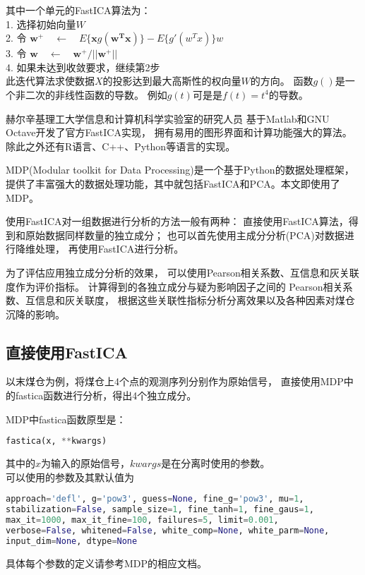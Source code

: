 其中一个单元的FastICA算法为：\\
	1. 选择初始向量$W$ \\
	2. 令 $\bm{w}^{+} \quad \leftarrow 
			\quad E\{\bm{x}g(\bm{w^Tx})\} - E\{g'(w^Tx)\}w$ \\
	3. 令 $\bm{w} \quad \leftarrow \quad 
			\bm{w}^{+}/||\bm{w}^{+}||$ \\
	4. 如果未达到收敛要求，继续第2步 \\
此迭代算法求使数据$X$的投影达到最大高斯性的权向量$W$的方向。
函数$g()$是一个非二次的非线性函数的导数。
例如$g(t)$可是是$f(t)=t^4$的导数。

赫尔辛基理工大学信息和计算机科学实验室的研究人员
基于Matlab和GNU Octave开发了官方FastICA实现，
拥有易用的图形界面和计算功能强大的算法。
除此之外还有R语言、C++、Python等语言的实现。

MDP(Modular toolkit for Data Processing)是一个基于Python的数据处理框架，
提供了丰富强大的数据处理功能，其中就包括FastICA和PCA。本文即使用了MDP。

使用FastICA对一组数据进行分析的方法一般有两种：
直接使用FastICA算法，得到和原始数据同样数量的独立成分；
也可以首先使用主成分分析(PCA)对数据进行降维处理，
再使用FastICA进行分析。

为了评估应用独立成分分析的效果，
可以使用Pearson相关系数、互信息和灰关联度作为评价指标。
计算得到的各独立成分与疑为影响因子之间的
Pearson相关系数、互信息和灰关联度，
根据这些关联性指标分析分离效果以及各种因素对煤仓沉降的影响。

\subsection{直接使用FastICA}
以末煤仓为例，将煤仓上4个点的观测序列分别作为原始信号，
直接使用MDP中的fastica函数进行分析，得出4个独立成分。

MDP中fastica函数原型是：
\begin{lstlisting}[language=Python, basicstyle=\ttfamily]
fastica(x, **kwargs)
\end{lstlisting}
其中的$x$为输入的原始信号，$kwargs$是在分离时使用的参数。\\
可以使用的参数及其默认值为
\begin{lstlisting}[language=Python, basicstyle=\ttfamily]
approach='defl', g='pow3', guess=None, fine_g='pow3', mu=1, 
stabilization=False, sample_size=1, fine_tanh=1, fine_gaus=1,
max_it=1000, max_it_fine=100, failures=5, limit=0.001, 
verbose=False, whitened=False, white_comp=None, white_parm=None,
input_dim=None, dtype=None
\end{lstlisting}
具体每个参数的定义请参考MDP的相应文档。

